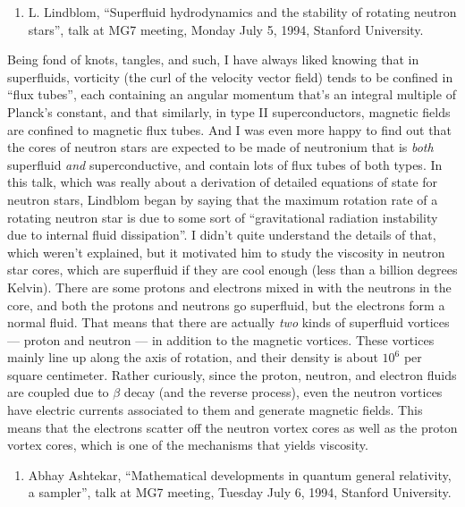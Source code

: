 \documentclass{article}
\def\tightlist{}
\begin{document}
\begin{enumerate}
\def\labelenumi{\arabic{enumi})}
\tightlist
\item
  L. Lindblom, ``Superfluid hydrodynamics and the stability of rotating
  neutron stars'', talk at MG7 meeting, Monday July 5, 1994, Stanford
  University.
\end{enumerate}

Being fond of knots, tangles, and such, I have always liked knowing that
in superfluids, vorticity (the curl of the velocity vector field) tends
to be confined in ``flux tubes'', each containing an angular momentum
that's an integral multiple of Planck's constant, and that similarly, in
type II superconductors, magnetic fields are confined to magnetic flux
tubes. And I was even more happy to find out that the cores of neutron
stars are expected to be made of neutronium that is \emph{both}
superfluid \emph{and} superconductive, and contain lots of flux tubes of
both types. In this talk, which was really about a derivation of
detailed equations of state for neutron stars, Lindblom began by saying
that the maximum rotation rate of a rotating neutron star is due to some
sort of ``gravitational radiation instability due to internal fluid
dissipation''. I didn't quite understand the details of that, which
weren't explained, but it motivated him to study the viscosity in
neutron star cores, which are superfluid if they are cool enough (less
than a billion degrees Kelvin). There are some protons and electrons
mixed in with the neutrons in the core, and both the protons and
neutrons go superfluid, but the electrons form a normal fluid. That
means that there are actually \emph{two} kinds of superfluid vortices
--- proton and neutron --- in addition to the magnetic vortices. These
vortices mainly line up along the axis of rotation, and their density is
about \(10^6\) per square centimeter. Rather curiously, since the
proton, neutron, and electron fluids are coupled due to \(\beta\) decay
(and the reverse process), even the neutron vortices have electric
currents associated to them and generate magnetic fields. This means
that the electrons scatter off the neutron vortex cores as well as the
proton vortex cores, which is one of the mechanisms that yields
viscosity.

\begin{enumerate}
\def\labelenumi{\arabic{enumi})}
\setcounter{enumi}{1}
\tightlist
\item
  Abhay Ashtekar, ``Mathematical developments in quantum general
  relativity, a sampler'', talk at MG7 meeting, Tuesday July 6, 1994,
  Stanford University.
\end{enumerate}
\end{document}
